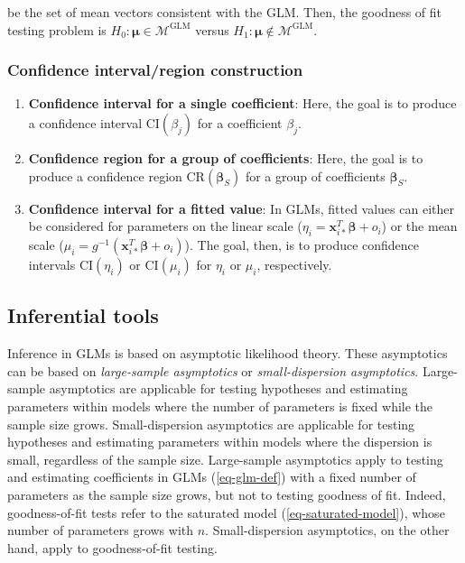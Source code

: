 \documentclass[
  11pt,
  letterpaper,
  oneside]{book}
\providecommand{\tightlist}{%
  \setlength{\itemsep}{0pt}\setlength{\parskip}{0pt}}\usepackage{longtable,booktabs,array}
\theoremstyle{definition}
\theoremstyle{plain}
\theoremstyle{plain}
\theoremstyle{plain}
\theoremstyle{remark}
\begin{document}
be the set of mean vectors consistent with the GLM. Then, the goodness
of fit testing problem is
\(H_0: \boldsymbol{\mu} \in \mathcal{M}^{\text{GLM}}\) versus
\(H_1: \boldsymbol{\mu} \notin \mathcal{M}^{\text{GLM}}\).

\hypertarget{sec-confidence-interval-region}{%
\subsubsection{Confidence interval/region
construction}\label{sec-confidence-interval-region}}

\begin{enumerate}
\def\labelenumi{\arabic{enumi}.}
\tightlist
\item
  \textbf{Confidence interval for a single coefficient}: Here, the goal
  is to produce a confidence interval \(\text{CI}(\beta_j)\) for a
  coefficient \(\beta_j\).
\item
  \textbf{Confidence region for a group of coefficients}: Here, the goal
  is to produce a confidence region \(\text{CR}(\boldsymbol{\beta}_S)\)
  for a group of coefficients \(\boldsymbol{\beta}_S\).
\item
  \textbf{Confidence interval for a fitted value}: In GLMs, fitted
  values can either be considered for parameters on the linear scale
  (\(\eta_i = \boldsymbol{x}_{i*}^T \boldsymbol{\beta} + o_i\)) or the
  mean scale
  (\(\mu_i = g^{-1}(\boldsymbol{x}_{i*}^T \boldsymbol{\beta} + o_i)\)).
  The goal, then, is to produce confidence intervals
  \(\text{CI}(\eta_i)\) or \(\text{CI}(\mu_i)\) for \(\eta_i\) or
  \(\mu_i\), respectively.
\end{enumerate}

\hypertarget{sec-inferential-tools}{%
\subsection{Inferential tools}\label{sec-inferential-tools}}

Inference in GLMs is based on asymptotic likelihood theory. These
asymptotics can be based on \emph{large-sample asymptotics} or
\emph{small-dispersion asymptotics}. Large-sample asymptotics are
applicable for testing hypotheses and estimating parameters within
models where the number of parameters is fixed while the sample size
grows. Small-dispersion asymptotics are applicable for testing
hypotheses and estimating parameters within models where the dispersion
is small, regardless of the sample size. Large-sample asymptotics apply
to testing and estimating coefficients in GLMs (\ref{eq-glm-def}) with a
fixed number of parameters as the sample size grows, but not to testing
goodness of fit. Indeed, goodness-of-fit tests refer to the saturated
model (\ref{eq-saturated-model}), whose number of parameters grows with
\(n\). Small-dispersion asymptotics, on the other hand, apply to
goodness-of-fit testing.
\end{document}

